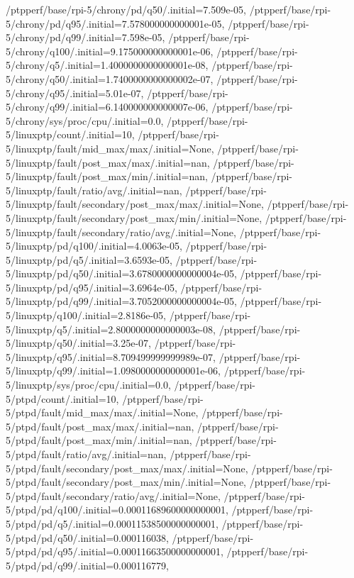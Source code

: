{    /ptpperf/base/rpi-5/chrony/pd/q50/.initial=7.509e-05,
    /ptpperf/base/rpi-5/chrony/pd/q95/.initial=7.578000000000001e-05,
    /ptpperf/base/rpi-5/chrony/pd/q99/.initial=7.598e-05,
    /ptpperf/base/rpi-5/chrony/q100/.initial=9.175000000000001e-06,
    /ptpperf/base/rpi-5/chrony/q5/.initial=1.4000000000000001e-08,
    /ptpperf/base/rpi-5/chrony/q50/.initial=1.7400000000000002e-07,
    /ptpperf/base/rpi-5/chrony/q95/.initial=5.01e-07,
    /ptpperf/base/rpi-5/chrony/q99/.initial=6.140000000000007e-06,
    /ptpperf/base/rpi-5/chrony/sys/proc/cpu/.initial=0.0,
    /ptpperf/base/rpi-5/linuxptp/count/.initial=10,
    /ptpperf/base/rpi-5/linuxptp/fault/mid_max/max/.initial=None,
    /ptpperf/base/rpi-5/linuxptp/fault/post_max/max/.initial=nan,
    /ptpperf/base/rpi-5/linuxptp/fault/post_max/min/.initial=nan,
    /ptpperf/base/rpi-5/linuxptp/fault/ratio/avg/.initial=nan,
    /ptpperf/base/rpi-5/linuxptp/fault/secondary/post_max/max/.initial=None,
    /ptpperf/base/rpi-5/linuxptp/fault/secondary/post_max/min/.initial=None,
    /ptpperf/base/rpi-5/linuxptp/fault/secondary/ratio/avg/.initial=None,
    /ptpperf/base/rpi-5/linuxptp/pd/q100/.initial=4.0063e-05,
    /ptpperf/base/rpi-5/linuxptp/pd/q5/.initial=3.6593e-05,
    /ptpperf/base/rpi-5/linuxptp/pd/q50/.initial=3.6780000000000004e-05,
    /ptpperf/base/rpi-5/linuxptp/pd/q95/.initial=3.6964e-05,
    /ptpperf/base/rpi-5/linuxptp/pd/q99/.initial=3.7052000000000004e-05,
    /ptpperf/base/rpi-5/linuxptp/q100/.initial=2.8186e-05,
    /ptpperf/base/rpi-5/linuxptp/q5/.initial=2.8000000000000003e-08,
    /ptpperf/base/rpi-5/linuxptp/q50/.initial=3.25e-07,
    /ptpperf/base/rpi-5/linuxptp/q95/.initial=8.709499999999989e-07,
    /ptpperf/base/rpi-5/linuxptp/q99/.initial=1.0980000000000001e-06,
    /ptpperf/base/rpi-5/linuxptp/sys/proc/cpu/.initial=0.0,
    /ptpperf/base/rpi-5/ptpd/count/.initial=10,
    /ptpperf/base/rpi-5/ptpd/fault/mid_max/max/.initial=None,
    /ptpperf/base/rpi-5/ptpd/fault/post_max/max/.initial=nan,
    /ptpperf/base/rpi-5/ptpd/fault/post_max/min/.initial=nan,
    /ptpperf/base/rpi-5/ptpd/fault/ratio/avg/.initial=nan,
    /ptpperf/base/rpi-5/ptpd/fault/secondary/post_max/max/.initial=None,
    /ptpperf/base/rpi-5/ptpd/fault/secondary/post_max/min/.initial=None,
    /ptpperf/base/rpi-5/ptpd/fault/secondary/ratio/avg/.initial=None,
    /ptpperf/base/rpi-5/ptpd/pd/q100/.initial=0.00011689600000000001,
    /ptpperf/base/rpi-5/ptpd/pd/q5/.initial=0.00011538500000000001,
    /ptpperf/base/rpi-5/ptpd/pd/q50/.initial=0.000116038,
    /ptpperf/base/rpi-5/ptpd/pd/q95/.initial=0.00011663500000000001,
    /ptpperf/base/rpi-5/ptpd/pd/q99/.initial=0.000116779,
}

